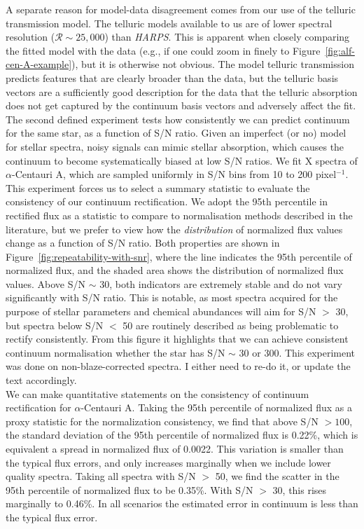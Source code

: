 \documentclass[modern]{aastex631}
\newcommand{\project}[1]{\textit{#1}}
\newcommand{\harps}{\project{HARPS}}
\newcommand{\todo}[1]{\textcolor{tab:red}{#1}}
\begin{document}
A separate reason for model-data disagreement comes from our use of the telluric transmission model. The telluric models available to us are of lower spectral resolution ($\mathcal{R} \sim 25{,}000$) than \harps. This is apparent when closely comparing the fitted model with the data (e.g., if one could zoom in finely to Figure~\ref{fig:alf-cen-A-example}), but it is otherwise not obvious. The model telluric transmission predicts features that are clearly broader than the data, but the telluric basis vectors are a sufficiently good description for the data that the telluric absorption does not get captured by the continuum basis vectors and adversely affect the fit.\\

The second defined experiment tests how consistently we can predict continuum for the same star, as a function of S/N ratio. Given an imperfect (or no) model for stellar spectra, noisy signals can mimic stellar absorption, which causes the continuum to become systematically biased at low S/N ratios. We fit \todo{X} spectra of $\alpha$-Centauri A, which are sampled uniformly in S/N bins from 10 to 200 pixel$^{-1}$. This experiment forces us to select a summary statistic to evaluate the consistency of our continuum rectification. We adopt the 95th percentile in rectified flux as a statistic to compare to normalisation methods described in the literature, but we prefer to view how the \emph{distribution} of normalized flux values change as a function of S/N ratio. Both properties are shown in Figure~\ref{fig:repeatability-with-snr}, where the line indicates the 95th percentile of normalized flux, and the shaded area shows the distribution of normalized flux values. Above S/N $\sim$ 30, both indicators are extremely stable and do not vary significantly with S/N ratio. This is notable, as most spectra acquired for the purpose of stellar parameters and chemical abundances will aim for S/N $>$ 30, but spectra below S/N $<$ 50 are routinely described as being problematic to rectify consistently. From this figure it highlights that we can achieve consistent continuum normalisation whether the star has S/N $\sim$ 30 or 300. \todo{This experiment was done on non-blaze-corrected spectra. I either need to re-do it, or update the text accordingly.}\\

We can make quantitative statements on the consistency of continuum rectification for $\alpha$-Centauri A. Taking the 95th percentile of normalized flux as a proxy statistic for the normalization consistency, we find that above S/N $> 100$, the standard deviation of the 95th percentile of normalized flux is 0.22\%, which is equivalent a spread in normalized flux of 0.0022. This variation is smaller than the typical flux errors, and only increases marginally when we include lower quality spectra. Taking all spectra with S/N $>$ 50, we find the scatter in the 95th percentile of normalized flux to be 0.35\%. With S/N $>$ 30, this rises marginally to 0.46\%. In all scenarios the estimated error in continuum is less than the typical flux error.\\
\end{document}
